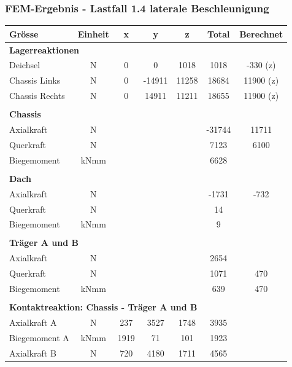   \subsubsection{FEM-Ergebnis - Lastfall 1.4 laterale Beschleunigung}
  \begin{table}[H]
  \centering
      \begin{threeparttable}
  \begin{tabular}{lcccccc}
  Grösse	&	Einheit	&	x	&	y	&	z	&	Total	&	Berechnet	\\	\hline
  \multicolumn{5}{l}{\textbf{Lagerreaktionen}}									&		&		\\	\thickhline
  Deichsel	&	N	&	0	&	0	&	1018	&	1018	&	-330 (z)	\\
  Chassis Links	&	N	&	0	&	-14911	&	11258	&	18684	&	11900 (z)	\\
  Chassis Rechts	&	N	&	0	&	14911	&	11211	&	18655	&	11900 (z)	\\	\hline	\\
  \multicolumn{5}{l}{\textbf{Chassis}}									&		&		\\	\thickhline
  Axialkraft	&	N	&		&		&		&	-31744	&	11711	\\
  Querkraft	&	N	&		&		&		&	7123	&	6100\tnote{5} \\
  Biegemoment	&	kNmm	&		&		&		&	6628	&		\\	\hline	\\
  \multicolumn{5}{l}{\textbf{Dach}}									&		&		\\	\thickhline
  Axialkraft	&	N	&		&		&		&	-1731	&	-732	\\
  Querkraft	&	N	&		&		&		&	14	&		\\
  Biegemoment	&	kNmm	&		&		&		&	9	&		\\	\hline	\\
  \multicolumn{5}{l}{\textbf{Träger A und B}}													\\	\thickhline
  Axialkraft	&	N	&		&		&		&	2654	&		\\
  Querkraft	&	N	&		&		&		&	1071	&	470	\\
  Biegemoment	&	kNmm	&		&		&		&	639	&	470	\\	\hline	\\
  \multicolumn{5}{l}{\textbf{Kontaktreaktion: Chassis - Träger A und B}}									&		&		\\	\thickhline
  Axialkraft A	&	N	&	237	&	3527	&	1748	&	3935	&		\\
  Biegemoment A	&	kNmm	&	1919	&	71	&	101	&	1923	&		\\
  Axialkraft B	&	N	&	720	&	4180	&	1711	&	4565	&		\\

\end{tabular}
\end{threeparttable}
\end{table}
